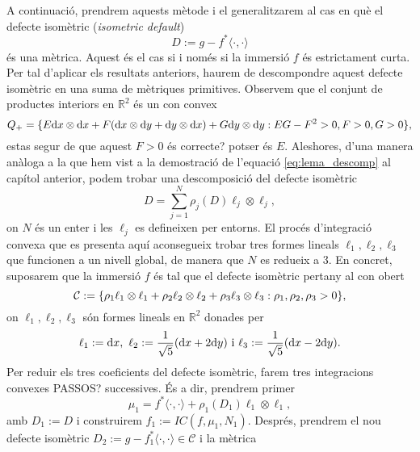 A continuació, prendrem aquests mètode i el generalitzarem al cas en què el defecte isomètric (\textit{isometric default}) 
\begin{equation*}
    D:=g-f^*\langle\cdot, \cdot\rangle
\end{equation*}
és una mètrica. Aquest és el cas si i només si la immersió $f$ és estrictament curta. Per tal d'aplicar els resultats anteriors, haurem de descompondre aquest defecte isomètric en una suma de mètriques primitives. Observem que el conjunt de productes interiors en $\mathbb R^2$ és un con convex
\begin{equation*}
    Q_+ = \{E\text dx\otimes\text dx + F(\text dx\otimes\text dy + \text dy\otimes\text dx) + G\text dy\otimes\text dy : EG-F^2>0, F>0, G>0\},
\end{equation*}
{\color{blue} estas segur de que aquest $F>0$ és correcte? potser és $E$.}
Aleshores, d'una manera anàloga a la que hem vist a la demostració de l'equació \ref{eq:lema_descomp} al capítol anterior, podem trobar una descomposició del defecte isomètric
\begin{equation*}
    D = \sum_{j=1}^N \rho_j(D) \ell_j\otimes\ell_j,
\end{equation*}
on $N$ és un enter i les $\ell_j$ es defineixen per entorns. El procés d'integració convexa que es presenta aquí aconsegueix trobar tres formes lineals $\ell_1, \ell_2, \ell_3$ que funcionen a un nivell global, de manera que $N$ es redueix a $3$.
En concret, suposarem que la immersió $f$ és tal que el defecte isomètric pertany al con obert
\begin{equation*}
    \mathcal C:=\{\rho_1\ell_1\otimes\ell_1 + \rho_2\ell_2\otimes\ell_2 + \rho_3\ell_3\otimes\ell_3 : \rho_1, \rho_2, \rho_3 > 0\},
\end{equation*}
on $\ell_1, \ell_2, \ell_3$ són formes lineals en $\mathbb R^2$ donades per 
\begin{equation*}
    \ell_1:=\text dx, \text{ } \ell_2:=\frac{1}{\sqrt5}(\text dx + 2\text dy) \text{ i } \ell_3:=\frac{1}{\sqrt5}(\text dx - 2\text dy).
\end{equation*}
Per reduir els tres coeficients del defecte isomètric, farem tres integracions convexes {\color{blue} PASSOS?} successives. És a dir, prendrem primer
\begin{equation*}
    \mu_1 = f^*\langle\cdot, \cdot\rangle + \rho_1(D_1)\ell_1\otimes\ell_1,
\end{equation*}
amb $D_1:=D$ i construirem $f_1:=IC(f, \mu_1, N_1)$. Després, prendrem el nou defecte isomètric $D_2 := g-f_1^*\langle\cdot, \cdot\rangle\in\mathcal C$ i la mètrica
